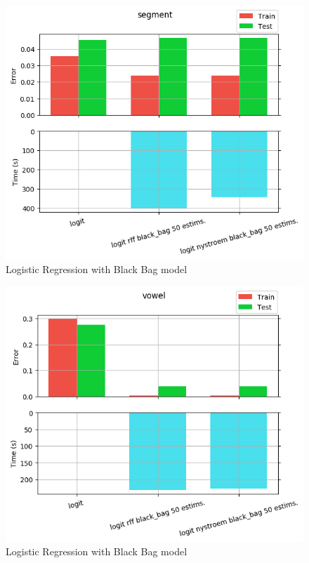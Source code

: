\begin{figure}[th]
\centering
\includegraphics[scale=\imgscale]{Figures/2_2/segment}
\decoRule
\caption[2.2 segment]{Logistic Regression with Black Bag model}
\label{fig:2_2_segment}
\end{figure}

\begin{figure}[th]
\centering
\includegraphics[scale=\imgscale]{Figures/2_2/vowel}
\decoRule
\caption[2.2 vowel]{Logistic Regression with Black Bag model}
\label{fig:vowel}
\end{figure}
